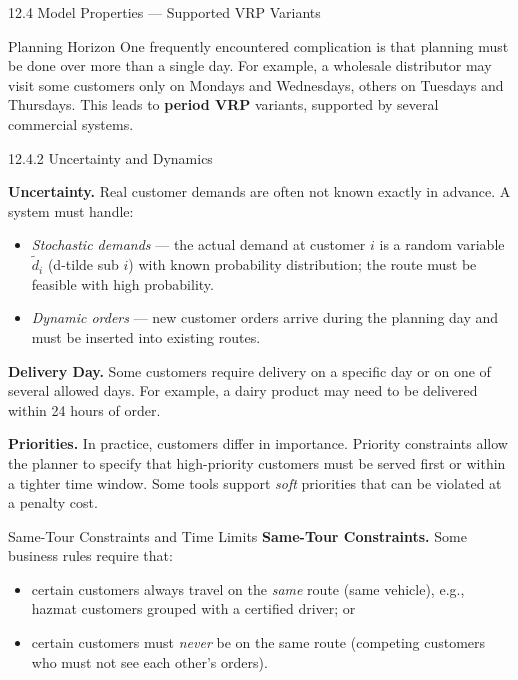 \documentclass[aspectratio=169,10pt]{beamer}
\begin{document}
\begin{frame}[allowframebreaks]{12.4 \; Model Properties --- Supported VRP Variants}
  \begin{block}{Planning Horizon}
    One frequently encountered complication is that planning must be done
    over more than a single day.
    For example, a wholesale distributor may visit some customers only on
    Mondays and Wednesdays, others on Tuesdays and Thursdays.
    This leads to \textbf{period VRP} variants, supported by several
    commercial systems.
  \end{block}

  \framebreak

  \begin{block}{12.4.2 \; Uncertainty and Dynamics}

    \textbf{Uncertainty.}
    Real customer demands are often not known exactly in advance.
    A system must handle:
    \begin{itemize}
      \item \emph{Stochastic demands} --- the actual demand at customer $i$
            is a random variable $\tilde{d}_i$ (d-tilde sub $i$) with
            known probability distribution; the route must be feasible
            with high probability.
      \item \emph{Dynamic orders} --- new customer orders arrive during the
            planning day and must be inserted into existing routes.
    \end{itemize}

    \textbf{Delivery Day.}
    Some customers require delivery on a specific day or on one of several
    allowed days.
    For example, a dairy product may need to be delivered within 24 hours of
    order.

    \textbf{Priorities.}
    In practice, customers differ in importance.
    Priority constraints allow the planner to specify that high-priority
    customers must be served first or within a tighter time window.
    Some tools support \emph{soft} priorities that can be violated at a penalty cost.
  \end{block}

  \framebreak

  \begin{block}{Same-Tour Constraints and Time Limits}
    \textbf{Same-Tour Constraints.}
    Some business rules require that:
    \begin{itemize}
      \item certain customers always travel on the \emph{same} route (same vehicle),
            e.g., hazmat customers grouped with a certified driver; or
      \item certain customers must \emph{never} be on the same route
            (competing customers who must not see each other's orders).
    \end{itemize}


\end{block}
\end{frame}
\end{document}
